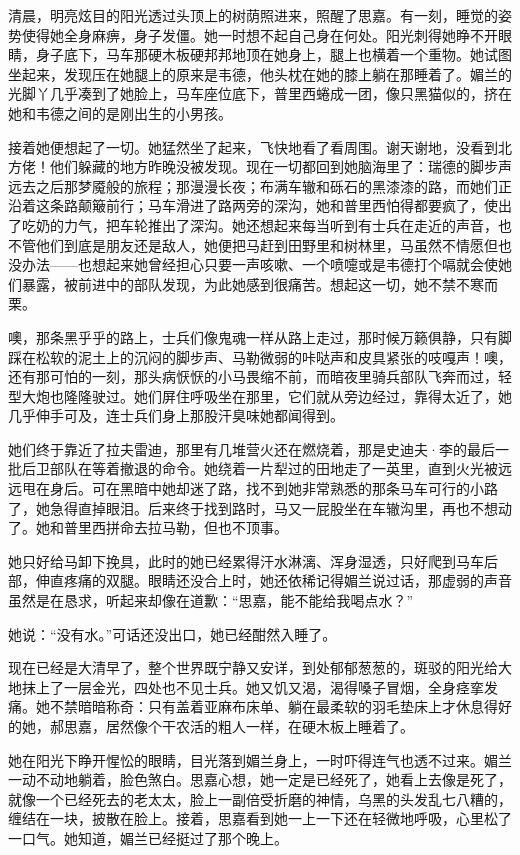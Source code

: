 \par 清晨，明亮炫目的阳光透过头顶上的树荫照进来，照醒了思嘉。有一刻，睡觉的姿势使得她全身麻痹，身子发僵。她一时想不起自己身在何处。阳光刺得她睁不开眼睛，身子底下，马车那硬木板硬邦邦地顶在她身上，腿上也横着一个重物。她试图坐起来，发现压在她腿上的原来是韦德，他头枕在她的膝上躺在那睡着了。媚兰的光脚丫几乎凑到了她脸上，马车座位底下，普里西蜷成一团，像只黑猫似的，挤在她和韦德之间的是刚出生的小男孩。
\par 接着她便想起了一切。她猛然坐了起来，飞快地看了看周围。谢天谢地，没看到北方佬！他们躲藏的地方昨晚没被发现。现在一切都回到她脑海里了：瑞德的脚步声远去之后那梦魇般的旅程；那漫漫长夜；布满车辙和砾石的黑漆漆的路，而她们正沿着这条路颠簸前行；马车滑进了路两旁的深沟，她和普里西怕得都要疯了，使出了吃奶的力气，把车轮推出了深沟。她还想起来每当听到有士兵在走近的声音，也不管他们到底是朋友还是敌人，她便把马赶到田野里和树林里，马虽然不情愿但也没办法——也想起来她曾经担心只要一声咳嗽、一个喷嚏或是韦德打个嗝就会使她们暴露，被前进中的部队发现，为此她感到很痛苦。想起这一切，她不禁不寒而栗。
\par 噢，那条黑乎乎的路上，士兵们像鬼魂一样从路上走过，那时候万籁俱静，只有脚踩在松软的泥土上的沉闷的脚步声、马勒微弱的咔哒声和皮具紧张的吱嘎声！噢，还有那可怕的一刻，那头病恹恹的小马畏缩不前，而暗夜里骑兵部队飞奔而过，轻型大炮也隆隆驶过。她们屏住呼吸坐在那里，它们就从旁边经过，靠得太近了，她几乎伸手可及，连士兵们身上那股汗臭味她都闻得到。
\par 她们终于靠近了拉夫雷迪，那里有几堆营火还在燃烧着，那是史迪夫·李的最后一批后卫部队在等着撤退的命令。她绕着一片犁过的田地走了一英里，直到火光被远远甩在身后。可在黑暗中她却迷了路，找不到她非常熟悉的那条马车可行的小路了，她急得直掉眼泪。后来终于找到路时，马又一屁股坐在车辙沟里，再也不想动了。她和普里西拼命去拉马勒，但也不顶事。
\par 她只好给马卸下挽具，此时的她已经累得汗水淋漓、浑身湿透，只好爬到马车后部，伸直疼痛的双腿。眼睛还没合上时，她还依稀记得媚兰说过话，那虚弱的声音虽然是在恳求，听起来却像在道歉：“思嘉，能不能给我喝点水？”
\par 她说：“没有水。”可话还没出口，她已经酣然入睡了。
\par 现在已经是大清早了，整个世界既宁静又安详，到处郁郁葱葱的，斑驳的阳光给大地抹上了一层金光，四处也不见士兵。她又饥又渴，渴得嗓子冒烟，全身痉挛发痛。她不禁暗暗称奇：只有盖着亚麻布床单、躺在最柔软的羽毛垫床上才休息得好的她，郝思嘉，居然像个干农活的粗人一样，在硬木板上睡着了。
\par 她在阳光下睁开惺忪的眼睛，目光落到媚兰身上，一时吓得连气也透不过来。媚兰一动不动地躺着，脸色煞白。思嘉心想，她一定是已经死了，她看上去像是死了，就像一个已经死去的老太太，脸上一副倍受折磨的神情，乌黑的头发乱七八糟的，缠结在一块，披散在脸上。接着，思嘉看到她一上一下还在轻微地呼吸，心里松了一口气。她知道，媚兰已经挺过了那个晚上。
